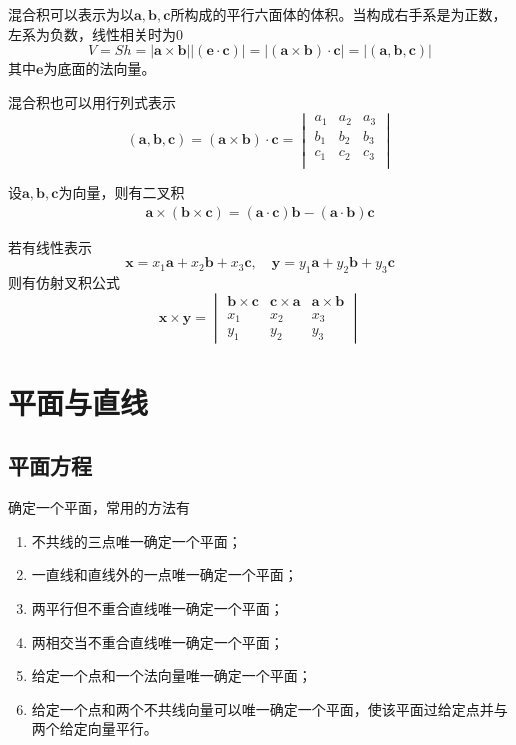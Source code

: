 混合积可以表示为以$\bm{a},\bm{b},\bm{c}$所构成的平行六面体的体积。当构成右手系是为正数，左系为负数，线性相关时为$0$
\begin{equation}
    V = Sh = |\bm{a}\times\bm{b}||(\bm{e}\cdot\bm{c})| = |(\bm{a}\times\bm{b})\cdot\bm{c}| = |(\bm{a},\bm{b},\bm{c})|
\end{equation}
其中$\bm{e}$为底面的法向量。

混合积也可以用行列式表示
\begin{equation}
    (\bm{a},\bm{b},\bm{c}) = (\bm{a}\times\bm{b})\cdot\bm{c}
    =
    \begin{vmatrix}
        a_1 & a_2 & a_3 \\
        b_1 & b_2 & b_3 \\
        c_1 & c_2 & c_3 \\
    \end{vmatrix}
\end{equation}

设$\bm{a},\bm{b},\bm{c}$为向量，则有二叉积
\begin{eqnarray}
    \label{eq:二叉积}
    \bm{a}\times(\bm{b}\times\bm{c}) = (\bm{a}\cdot\bm{c})\bm{b} - (\bm{a}\cdot\bm{b})\bm{c}
\end{eqnarray}

若有线性表示
\[ \bm{x} = x_1\bm{a} + x_2\bm{b} + x_3\bm{c}, \quad \bm{y} = y_1\bm{a} + y_2\bm{b} + y_3\bm{c} \]
则有仿射叉积公式
\begin{equation}
    \bm{x}\times\bm{y}=
    \begin{vmatrix}
        \bm{b}\times\bm{c} & \bm{c}\times\bm{a} & \bm{a}\times\bm{b} \\
        x_1                & x_2                & x_3                \\
        y_1                & y_2                & y_3
    \end{vmatrix}
\end{equation}

\section{平面与直线}
\subsection{平面方程}
确定一个平面，常用的方法有
\begin{enumerate}[(1)]
    \item 不共线的三点唯一确定一个平面；
    \item 一直线和直线外的一点唯一确定一个平面；
    \item 两平行但不重合直线唯一确定一个平面；
    \item 两相交当不重合直线唯一确定一个平面；
    \item 给定一个点和一个法向量唯一确定一个平面；
    \item 给定一个点和两个不共线向量可以唯一确定一个平面，使该平面过给定点并与两个给定向量平行。
\end{enumerate}
